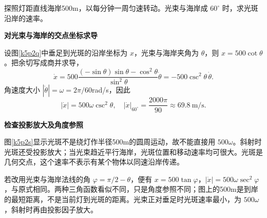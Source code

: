 \begin{question}\begin{example}[旋转探照灯的光斑]\label{k5p2}
探照灯距直线海岸500m，以每分钟一周匀速转动。光束与海岸成 $60^\circ$ 时，求光斑沿岸的速率。\end{example}
\end{question}
\begin{solution}\textbf{对光束与海岸的交点坐标求导}\par\nobreak
设图\ref{k5p2q}中垂足到光斑的沿岸坐标为 $x$，光束与海岸夹角为 $\theta$，则 $x=500\cot\theta$。把余切写成商并求导，
\[\dot x=500\frac{(-\sin\theta)\sin\theta-\cos^2\theta}{\sin^2\theta}\dot\theta
 =-500\csc^2\theta\,\dot\theta.\]
角速度大小 $|\dot\theta|=\omega=2\pi/60$rad/s，因此
\[|\dot x|=500\omega\csc^2\theta,\quad\boxed{|\dot x|_{60^\circ}=\frac{2000\pi}{90}\approx69.8\ \mathrm{m/s}}.\]


\par\medskip{}\noindent\textbf{检查投影放大及角度参照}\par\nobreak
图\ref{k5p2s}显示光斑不是绕灯作半径500m的圆周运动，故不能直接用 $500\omega$。斜射时光斑还受投影放大；当光束趋近平行海岸，光斑位置和移动速率均可很大。光斑是几何交点，这个速率不表示有某个物体以同速沿岸传递。

若改用光束与海岸法线的角 $\varphi=\pi/2-\theta$，便有 $x=500\tan\varphi$，$|\dot x|=500\omega\sec^2\varphi$，与原式相同。两种三角函数看似不同，只是角度参照不同；图上的500m是到岸的最短距离，不是当前灯到光斑的距离。光束正对垂足时光斑速率最小，为 $500\omega$，斜射时再由投影因子放大。\end{solution}

